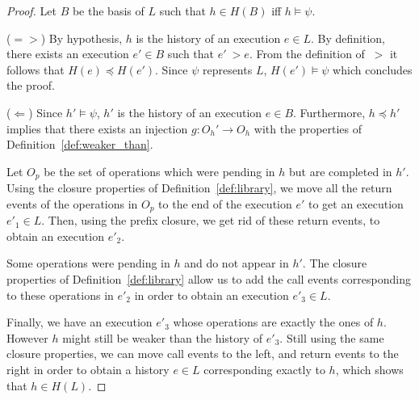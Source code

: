 \begin{proof}
Let $B$ be the basis of $L$
such that $h\in H(B)$ iff $h\models \psi$.

($=>$) By hypothesis, $h$ is the history of an execution $e\in L$.  By definition, there exists
an execution $e'\in B$ such that $e' ~> e$. From the definition of $~>$ it follows that $H(e)\preceq H(e')$.
Since $\psi$ represents $L$, $H(e')\models\psi$ which concludes the proof.


($\Leftarrow$) Since $h'\models\psi$, $h'$ is the history of an execution $e\in B$. Furthermore,
 $h\preceq h'$ implies that there exists an injection $g: O_h' \rightarrow O_h$ with the 
properties of Definition~\ref{def:weaker_than}. 

Let $O_p$ be the set of operations which were pending in $h$ but are completed in $h'$.
Using the closure properties of Definition~\ref{def:library}, we move all the return
events of the operations in $O_p$ to the end of the execution $e'$ to get an 
execution $e'_1 \in L$.
Then, using the prefix closure, we get rid of these return events, to obtain an 
execution $e'_2$.

Some operations were pending in $h$ and do not appear in $h'$. The closure
properties of Definition~\ref{def:library} allow us to add the call events corresponding
to these operations in $e'_2$ in order to obtain an execution $e'_3 \in L$.

Finally, we have an execution $e'_3$ whose operations are exactly the ones of $h$.
However $h$ might still be weaker than the history of $e'_3$. Still using the same 
closure properties, we can move call events to the left, and return events to the right
in order to obtain a history $e \in L$ corresponding exactly to $h$, which shows
that $h \in H(L)$.
\end{proof}

